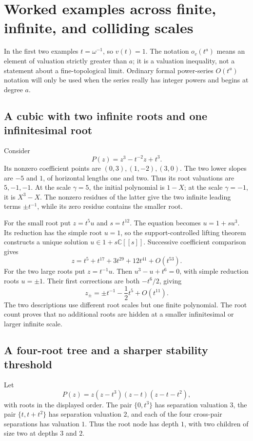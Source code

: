 \documentclass[11pt,letterpaper,oneside]{article}
\numberwithin{equation}{section}
\theoremstyle{definition}
\theoremstyle{remark}\newtheorem{remark}[theorem]{Remark}
\newcommand{\C}{\mathbb C}\newcommand{\R}{\mathbb R}\newcommand{\Q}{\mathbb Q}
\begin{document}
\section{Worked examples across finite, infinite, and colliding scales}\label{sec:examples}
In the first two examples $t=\omega^{-1}$, so $v(t)=1$. The notation
$o_v(t^a)$ means an element of valuation strictly greater than $a$;
it is a valuation inequality, not a statement about a fine-topological
limit. Ordinary formal power-series $O(t^a)$ notation will only be used
when the series really has integer powers and begins at degree $a$.

\subsection{A cubic with two infinite roots and one infinitesimal root}
Consider
\begin{equation}\label{eq:threecubic}
 P(z)=z^3-t^{-2}z+t^3.
\end{equation}
Its nonzero coefficient points are $(0,3),(1,-2),(3,0)$.
The two lower slopes are $-5$ and $1$, of horizontal lengths one and
two. Thus its root valuations are $5,-1,-1$.
At the scale $\gamma=5$, the initial polynomial is $1-X$; at the scale
$\gamma=-1$, it is $X^3-X$. The nonzero residues of the latter give
the two infinite leading terms $\pm t^{-1}$, while its zero residue
contains the smaller root.

For the small root put $z=t^5u$ and $s=t^{12}$. The equation becomes
$u=1+s u^3$. Its reduction has the simple root $u=1$, so the
support-controlled lifting theorem constructs a unique solution
$u\in1+s\C[[s]]$. Successive coefficient comparison gives
\begin{equation}\label{eq:smallcubicexpansion}
 z=t^5+t^{17}+3t^{29}+12t^{41}+O(t^{53}).
\end{equation}
For the two large roots put $z=t^{-1}u$. Then
$u^3-u+t^6=0$, with simple reduction roots $u=\pm1$.
Their first corrections are both $-t^6/2$, giving
\begin{equation}\label{eq:largecubicexpansion}
 z_\pm=\pm t^{-1}-\frac12t^5+O(t^{11}).
\end{equation}
The two descriptions use different root scales but one finite polynomial.
The root count proves that no additional roots are hidden at a smaller
infinitesimal or larger infinite scale.

\subsection{A four-root tree and a sharper stability threshold}\label{subsec:treeexample}
Let
\begin{equation}\label{eq:treequartic}
 P(z)=z(z-t^3)(z-t)(z-t-t^2),
\end{equation}
with roots in the displayed order. The pair $\{0,t^3\}$ has separation
valuation $3$, the pair $\{t,t+t^2\}$ has separation valuation $2$,
and each of the four cross-pair separations has valuation $1$.
Thus the root node has depth $1$, with two children of size two at
depths $3$ and $2$.
\end{document}

